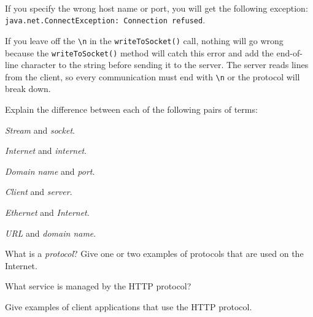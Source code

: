 {{{{\begin{ANS}
\item  \mbox{ }
\begin{ANSBL}
\item  If you specify the wrong host name or port, you will get the
following exception:
{\tt java.net.Connect\-Exception: Connection refused}.

\item  If you leave off the \verb|\n| in the {\tt writeToSocket()}
call, nothing will go wrong because the {\tt writeToSocket()} method
will catch this error and add the end-of-line character to the string
before sending it to the server.   The server reads lines from the
client, so every communication must end with \verb|\n| or the protocol
will break down.
\end{ANSBL}
\end{ANS}


\label{exercises}
\begin{EXRtwo}

\item  Explain the difference between each of the following pairs of terms:

\begin{EXRtwoLL}
\begin{multicols}{2}
\item  {\it Stream} and {\it socket}.
\item  {\it Internet} and {\it internet}.
\item  {\it Domain name} and {\it port}.
\item  {\it Client} and {\it server}.
\item  {\it Ethernet} and {\it Internet}.
\item  {\it URL} and {\it domain name}.
\end{multicols}
\end{EXRtwoLL}

\item  What is a {\it protocol}? Give one or two examples
of protocols that are used on the Internet.

\item  What service is managed by the HTTP protocol?

\item  Give examples of client applications that use
the HTTP \mbox{protocol.}


\end{EXRtwo}}}}}
